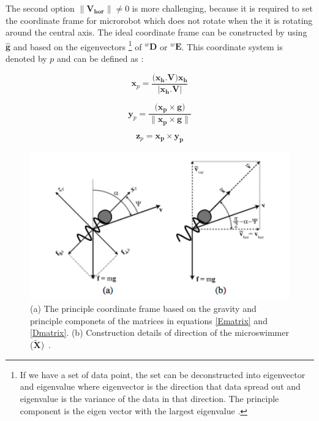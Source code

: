 \documentclass[12pt,a4paper,titlepage]{report}
\begin{document}
The second option ${\| \bm{{V}_{hor}}\|} \neq 0$ is more challenging, because it is required to set 
the coordinate frame for microrobot which does not rotate when the it is rotating around the central axis.
The ideal coordinate frame can be constructed by using $\hat{\bm{g}}$ and based on the eigenvectors
\footnote{If we have a set of data point, the set can be deconstructed into eigenvector and eigenvalue
where eigenvector is the direction that data spread out and eigenvalue is the variance of the data in that
direction. The principle component is the eigen vector with the largest eigenvalue \citep{Doe:2013Oct:Online}.} of 
$^{w}\bm{D}$ or $^{w}\bm{E}$. This coordinate system is denoted by $p$ and can be defined as :


\begin{equation}
 \bm{x}_p = \frac{(\bm{{x}_h . V )x_h}}{|\bm{x_h .V}|}
\label{x_pAxis}
\end{equation}



\begin{equation}
 \bm{y}_p = \frac{(\bm{{x}_p \times g)}}{\| \bm{x_p \times g}\|} 
\label{y_pAxis}
\end{equation}


\begin{equation}
 \bm{z}_p = \bm{{x}_p \times {y}_p}
\label{z_pAxis}
\end{equation}


\begin{figure}
  \centering
    \includegraphics[width=1.0\textwidth]{horiz_verti_velocity}
  \caption{(a) The principle coordinate frame based on the gravity and principle componets
of the matrices in equations \ref{Ematrix} and \ref{Dmatrix}. (b) Construction details of 
direction of the microswimmer ($\bm{\tilde{X}}$)~\citep{mahoney2011velocity}.}
  \label{horiz_verti_velocity}
\end{figure}
\end{document}
